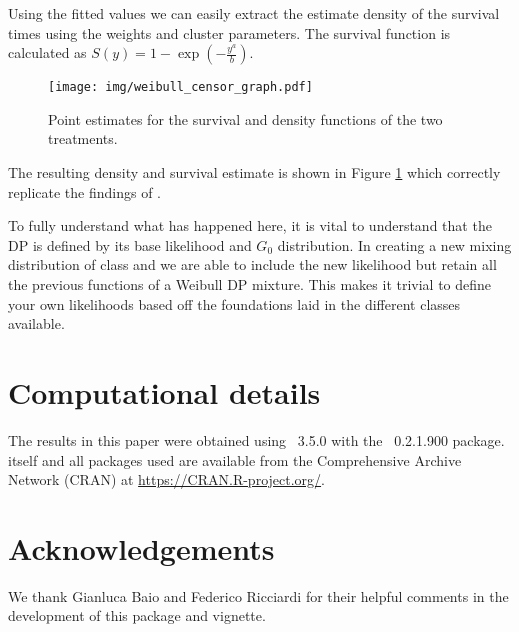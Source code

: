 \documentclass[nojss]{jss}
\begin{document}
Using the fitted values we can easily extract the estimate density of the survival times using the weights and cluster parameters. The survival function is calculated as $S(y) = 1 - \exp(- \frac{y ^a}{b})$.
\begin{figure}
\centering
\texttt{[image: img/weibull\_censor\_graph.pdf]}
\caption{Point estimates for the survival and density functions of the two treatments.}
\label{fig:weibull_cens}
\end{figure}
The resulting density and survival estimate is shown in Figure \ref{fig:weibull_cens} which correctly replicate the findings of \cite{kottas_nonparametric_2006}.

To fully understand what has happened here, it is vital to understand that the DP is defined by its base likelihood and $G_0$ distribution. In creating a new mixing distribution of class  and  we are able to include the new likelihood but retain all the previous functions of a Weibull DP mixture. This makes it trivial to define your own likelihoods based off the foundations laid in the different classes available.

\section*{Computational details}

The results in this paper were obtained using
~3.5.0 with the
~0.2.1.900 package.  itself
and all packages used are available from the Comprehensive
 Archive Network (CRAN) at
\url{https://CRAN.R-project.org/}.


\section*{Acknowledgements}

We thank Gianluca Baio and Federico Ricciardi for their helpful comments in the development of this package and vignette.


\end{document}
